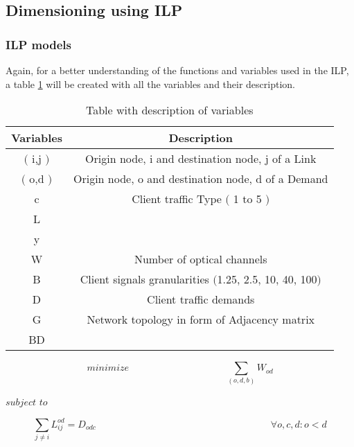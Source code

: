 \newpage
\subsection{Dimensioning using ILP}

\subsubsection{ILP models} \label{ILP_models_Transluc}

Again, for a better understanding of the functions and variables used in the ILP, a table \ref{description_transluc} will be created with all the variables and their description. \\

\begin{table}[h!]
\centering
\begin{tabular}{|| c | c||}
 \hline
 Variables & Description \\
 \hline\hline
 $($ i,j $)$ & Origin node, i and destination node, j of a Link \\
 $($ o,d $)$ & Origin node, o and destination node, d of a Demand \\
 c & Client traffic Type $($ 1 to 5 $)$ \\
 L &  \\
 y &  \\
 W & Number of optical channels \\
 B & Client signals granularities $($1.25, 2.5, 10, 40, 100$)$ \\
 D & Client traffic demands \\
 G & Network topology in form of Adjacency matrix \\
 BD & \\
 \hline
\end{tabular}
\caption{Table with description of variables}
\label{description_transluc}
\end{table}

\vspace{20pt}

\begin{equation}
minimize \qquad \qquad \qquad \qquad \qquad  \sum_{(o,d,b)} W_{od}
\label{ILPTransluc}
\end{equation}

$subject$ $to$

\begin{equation}
\sum_{j \neq i} L_{ij}^{od} = D_{odc}
\qquad \qquad \qquad \qquad \qquad \qquad \qquad \qquad \qquad
\forall o,c,d : o < d
\label{ILPTransluc1}
\end{equation}

